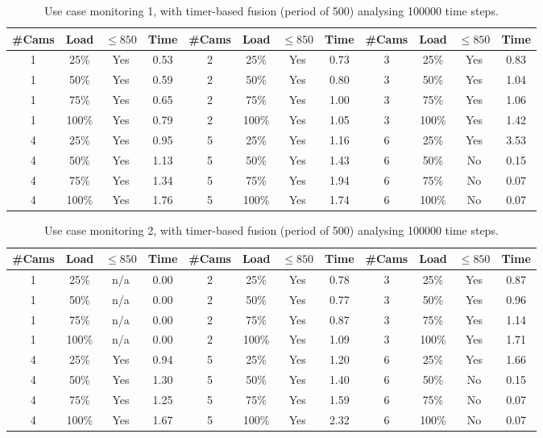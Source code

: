 \documentclass{article}
\begin{document}
\begin{table}
\centering
\begin{tabular}{|c|c|c|c|c|c|c|c|c|c|c|c|}
\hline
\#Cams & Load & $\leq 850$ & Time & \#Cams & Load & $\leq 850$ & Time & \#Cams & Load & $\leq 850$ & Time\\
\hline
1 & 25\% & Yes & 0.53 & 2 & 25\% & Yes & 0.73 & 3 & 25\% & Yes & 0.83\\
1 & 50\% & Yes & 0.59 & 2 & 50\% & Yes & 0.80 & 3 & 50\% & Yes & 1.04\\
1 & 75\% & Yes & 0.65 & 2 & 75\% & Yes & 1.00 & 3 & 75\% & Yes & 1.06\\
1 & 100\% & Yes & 0.79 & 2 & 100\% & Yes & 1.05 & 3 & 100\% & Yes & 1.42\\
\hline
4 & 25\% & Yes & 0.95 & 5 & 25\% & Yes & 1.16 & 6 & 25\% & Yes & 3.53\\
4 & 50\% & Yes & 1.13 & 5 & 50\% & Yes & 1.43 & 6 & 50\% & No & 0.15\\
4 & 75\% & Yes & 1.34 & 5 & 75\% & Yes & 1.94 & 6 & 75\% & No & 0.07\\
4 & 100\% & Yes & 1.76 & 5 & 100\% & Yes & 1.74 & 6 & 100\% & No & 0.07\\
\hline
\end{tabular}
\caption{Use case monitoring 1, with timer-based fusion (period of 500) analysing 100000 time steps.}
\end{table}


\begin{table}
\centering
\begin{tabular}{|c|c|c|c|c|c|c|c|c|c|c|c|}
\hline
\#Cams & Load & $\leq 850$ & Time & \#Cams & Load & $\leq 850$ & Time & \#Cams & Load & $\leq 850$ & Time\\
\hline
1 & 25\% & n/a & 0.00 & 2 & 25\% & Yes & 0.78 & 3 & 25\% & Yes & 0.87\\
1 & 50\% & n/a & 0.00 & 2 & 50\% & Yes & 0.77 & 3 & 50\% & Yes & 0.96\\
1 & 75\% & n/a & 0.00 & 2 & 75\% & Yes & 0.87 & 3 & 75\% & Yes & 1.14\\
1 & 100\% & n/a & 0.00 & 2 & 100\% & Yes & 1.09 & 3 & 100\% & Yes & 1.71\\
\hline
4 & 25\% & Yes & 0.94 & 5 & 25\% & Yes & 1.20 & 6 & 25\% & Yes & 1.66\\
4 & 50\% & Yes & 1.30 & 5 & 50\% & Yes & 1.40 & 6 & 50\% & No & 0.15\\
4 & 75\% & Yes & 1.25 & 5 & 75\% & Yes & 1.59 & 6 & 75\% & No & 0.07\\
4 & 100\% & Yes & 1.67 & 5 & 100\% & Yes & 2.32 & 6 & 100\% & No & 0.07\\
\hline
\end{tabular}
\caption{Use case monitoring 2, with timer-based fusion (period of 500) analysing 100000 time steps.}
\end{table}
\end{document}

